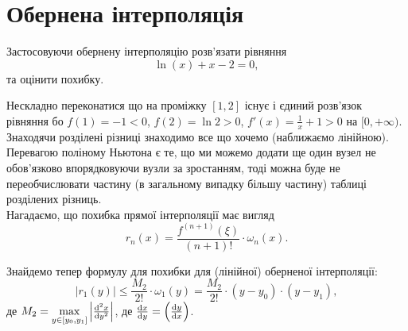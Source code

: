 
% 


% 



\section{Обернена інтерполяція}

\begin{problem}
	Застосовуючи обернену інтерполяцію розв'язати рівняння
	\begin{equation*}
		\ln(x) + x - 2 = 0,
	\end{equation*}
	та оцінити похибку.
\end{problem}

\begin{solution}
	Нескладно переконатися що на проміжку $[1, 2]$ існує і єдиний розв'язок рівняння бо $f(1) = -1 < 0$, $f(2) = \ln 2 > 0$, $f'(x) = \frac1x + 1 > 0$ на $[0, + \infty)$. Знаходячи розділені різниці знаходимо все що хочемо (наближаємо лінійною). \\

	Перевагою поліному Ньютона є те, що ми можемо додати ще один вузел не обов'язково впорядковуючи вузли за зростанням, тоді можна буде не переобчислювати частину (в загальному випадку більшу частину) таблиці розділених різниць. \\

	Нагадаємо, що похибка прямої інтерполяції має вигляд
	\begin{equation*}
		r_n(x) = \frac{f^{(n+1)}(\xi)}{(n + 1)!} \cdot \omega_n(x).
	\end{equation*}

	Знайдемо тепер формулу для похибки для (лінійної) оберненої інтерполяції:
	\begin{equation*}
		|r_1(y)| \le \frac{M_2}{2!} \cdot \omega_1(y) = \frac{M_2}{2!} \cdot (y - y_0) \cdot (y - y_1),
	\end{equation*}
	де $M_2 = \max\limits_{y \in [y_0, y_1]} \left| \frac{\mathop{}\!\mathrm{d}^2 x}{\mathop{}\!\mathrm{d} y^2} \right|$, де $\frac{\mathop{}\!\mathrm{d} x}{\mathop{}\!\mathrm{d} y} = \left( \frac{\mathop{}\!\mathrm{d} y}{\mathop{}\!\mathrm{d} x} \right)$.
\end{solution}

